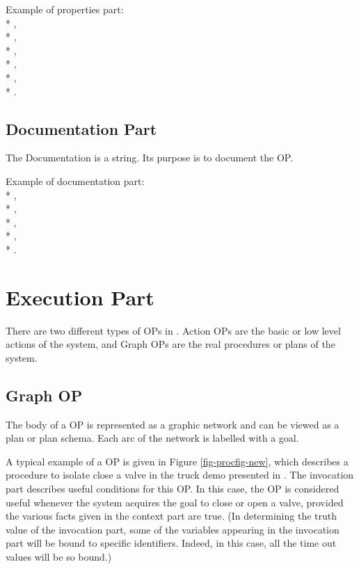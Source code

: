 Example of properties part: \\*
\code{()}, \\*
, \\*
, \\*
, \\*
, \\*
.

\subsection{Documentation Part}

The Documentation is a string. Its purpose is to document the OP.

Example of documentation part: \\*
, \\*
, \\*
,
\\*
, \\*
.

\section{Execution Part}

There are two different types of OPs in \COPRS{}. Action OPs are the
basic or low level actions of the system, and Graph OPs are the real
procedures or plans of the system.



\subsection{Graph OP}

The body of a OP is represented as a graphic network and can be viewed as a
plan or plan schema. Each arc of the network is labelled with a goal.


A typical example of a OP is given in Figure \ref{fig-procfig-new}, which
describes a procedure to isolate close a valve in the truck demo presented in
. The invocation part describes useful 
conditions for this OP. In this case, the OP is considered useful
whenever the system acquires the goal to close or open a valve, provided the
various facts given in the context part are true.  (In determining the truth
value of the invocation part, some of the variables appearing in the invocation
part will be bound to specific identifiers. Indeed, in this case, all the time
out values will be so bound.)


